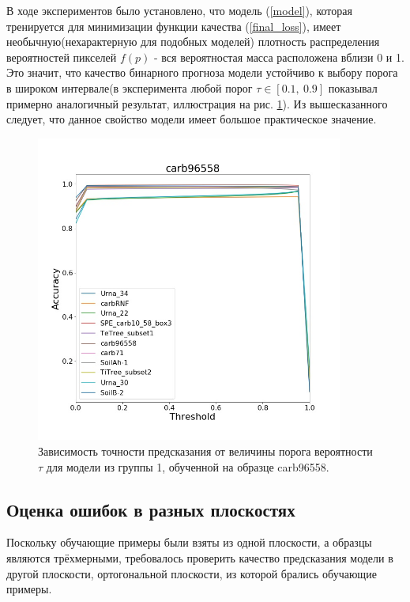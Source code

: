 \documentclass[12pt, a4paper]{extarticle}
\begin{document}
В ходе экспериментов было установлено, что 
модель (\ref{model}), которая тренируется для минимизации функции качества (\ref{final_loss}), имеет необычную(нехарактерную для подобных моделей) плотность распределения вероятностей пикселей $f(p)$ - вся вероятностая масса расположена вблизи 0 и 1. Это значит, что качество бинарного прогноза модели устойчиво к выбору порога в широком интервале(в эксперимента любой порог $\tau \in [0.1,\ 0.9]$ показывал примерно аналогичный результат, иллюстрация на рис. \ref{threshold_p}). Из вышесказанного следует, что данное свойство модели имеет большое практическое значение. 

\begin{figure}[h!]
\includegraphics[width=0.9\textwidth]{data/images/accuracy.jpg}
\caption{Зависимость точности предсказания от величины порога вероятности $\tau$ для модели из группы 1, обученной на образце carb96558.}
\label{threshold_p}
\end{figure}

\clearpage 

\subsection{Оценка ошибок в разных плоскостях}

Поскольку обучающие примеры были взяты из одной плоскости, а образцы являются трёхмерными, требовалось проверить качество предсказания модели в другой плоскости, ортогональной плоскости, из которой брались обучающие примеры. 
\end{document}
